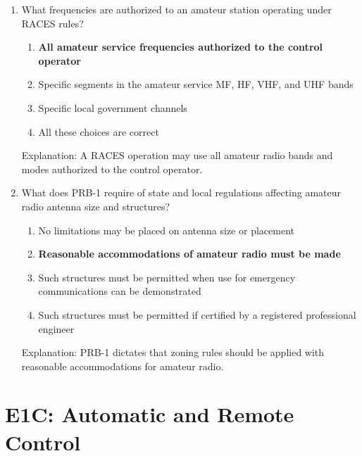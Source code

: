 \begin{enumerate}
    \item What frequencies are authorized to an amateur station operating under RACES rules?
    \begin{enumerate}
      \item \textbf {All amateur service frequencies authorized to the control operator}
    \item  Specific segments in the amateur service MF, HF, VHF, and UHF bands
    \item  Specific local government channels
        \item  All these choices are correct
    \end{enumerate}
     \textcolor{myred}{Explanation:}
     A RACES operation may use all amateur radio bands and modes authorized to the control operator.
    
    \item What does PRB-1 require of state and local regulations affecting amateur radio antenna size and structures?
    \begin{enumerate}
        \item No limitations may be placed on antenna size or placement
        \item \textbf {Reasonable accommodations of amateur radio must be made}
        \item  Such structures must be permitted when use for emergency communications can be demonstrated
        \item  Such structures must be permitted if certified by a registered professional engineer
        \end{enumerate}
     \textcolor{myred}{Explanation:}
     PRB-1 dictates that zoning rules should be applied with reasonable accommodations for amateur radio.
\end{enumerate}

\section{E1C: Automatic and Remote Control}
